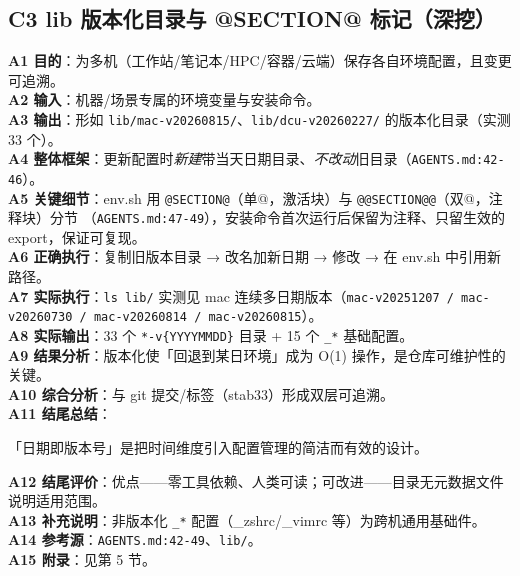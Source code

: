\documentclass[UTF8]{ctexart}
\begin{document}
\subsection{C3 lib 版本化目录与 @SECTION@ 标记（深挖）}
\textbf{A1 目的}：为多机（工作站/笔记本/HPC/容器/云端）保存各自环境配置，且变更可追溯。\\
\textbf{A2 输入}：机器/场景专属的环境变量与安装命令。\\
\textbf{A3 输出}：形如 \texttt{lib/mac-v20260815/}、\texttt{lib/dcu-v20260227/} 的版本化目录（实测 33 个）。\\
\textbf{A4 整体框架}：更新配置时\emph{新建}带当天日期目录、\emph{不改动}旧目录（\texttt{\nolinkurl{AGENTS.md:42-46}}）。\\
\textbf{A5 关键细节}：env.sh 用 \texttt{@SECTION@}（单@，激活块）与 \texttt{@@SECTION@@}（双@，注释块）分节
（\texttt{\nolinkurl{AGENTS.md:47-49}}），安装命令首次运行后保留为注释、只留生效的 export，保证可复现。\\
\textbf{A6 正确执行}：复制旧版本目录 → 改名加新日期 → 修改 → 在 env.sh 中引用新路径。\\
\textbf{A7 实际执行}：\texttt{ls lib/} 实测见 mac 连续多日期版本（\texttt{mac-v20251207 / mac-v20260730 / mac-v20260814 / mac-v20260815}）。\\
\textbf{A8 实际输出}：33 个 \texttt{*-v\{YYYYMMDD\}} 目录 + 15 个 \texttt{\_*} 基础配置。\\
\textbf{A9 结果分析}：版本化使「回退到某日环境」成为 O(1) 操作，是仓库可维护性的关键。\\
\textbf{A10 综合分析}：与 git 提交/标签（stab33）形成双层可追溯。\\
\textbf{A11 结尾总结}：\begin{algobox}「日期即版本号」是把时间维度引入配置管理的简洁而有效的设计。\end{algobox}
\textbf{A12 结尾评价}：优点——零工具依赖、人类可读；可改进——目录无元数据文件说明适用范围。\\
\textbf{A13 补充说明}：非版本化 \texttt{\_*} 配置（\_zshrc/\_vimrc 等）为跨机通用基础件。\\
\textbf{A14 参考源}：\texttt{\nolinkurl{AGENTS.md:42-49}}、\texttt{\nolinkurl{lib/}}。\\
\textbf{A15 附录}：见第 5 节。
\end{document}
